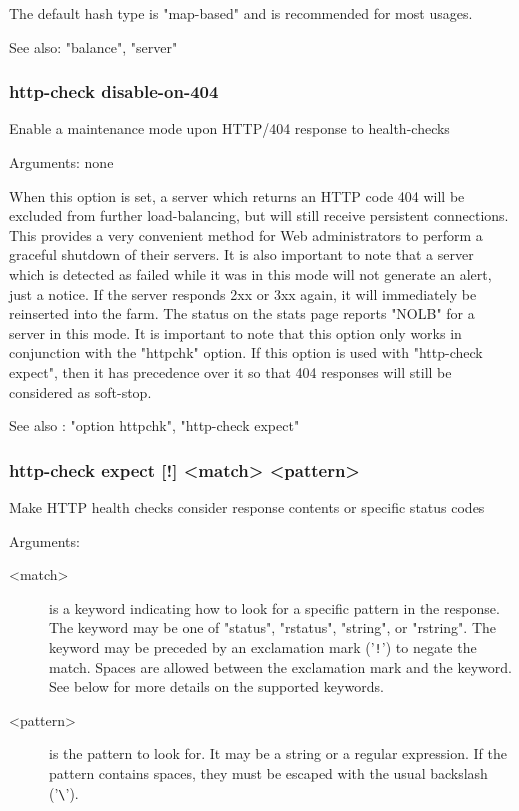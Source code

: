   The default hash type is "map-based" and is recommended for most usages.

  See also: "balance", "server"

\subsubsection[http-check disable-on-404]{http-check disable-on-404}
  Enable a maintenance mode upon HTTP/404 response to health-checks
  
  
  Arguments: none

  When this option is set, a server which returns an HTTP code 404 will be
  excluded from further load-balancing, but will still receive persistent
  connections. This provides a very convenient method for Web administrators
  to perform a graceful shutdown of their servers. It is also important to note
  that a server which is detected as failed while it was in this mode will not
  generate an alert, just a notice. If the server responds 2xx or 3xx again, it
  will immediately be reinserted into the farm. The status on the stats page
  reports "NOLB" for a server in this mode. It is important to note that this
  option only works in conjunction with the "httpchk" option. If this option
  is used with "http-check expect", then it has precedence over it so that 404
  responses will still be considered as soft-stop.

  See also : "option httpchk", "http-check expect"

\subsubsection[http-check expect]{http-check expect [!] <match> <pattern>}
  Make HTTP health checks consider response contents or specific status codes
  
  
  Arguments:
  \begin{description}
  \item[<match>]   is a keyword indicating how to look for a specific pattern in the
              response. The keyword may be one of "status", "rstatus",
              "string", or "rstring". The keyword may be preceded by an
              exclamation mark ('\verb|!|') to negate the match. Spaces are allowed
              between the exclamation mark and the keyword. See below for more
              details on the supported keywords.

  \item[<pattern>] is the pattern to look for. It may be a string or a regular
              expression. If the pattern contains spaces, they must be escaped
              with the usual backslash ('\verb|\|').
  \end{description}

